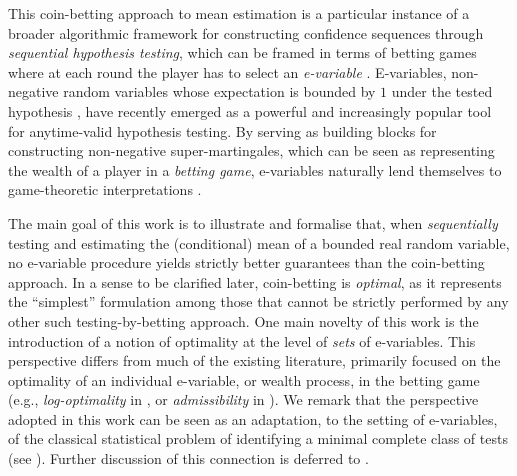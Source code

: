 \documentclass[3p, authoryear, 10pt]{elsarticle}%
\begin{document}
This coin-betting approach to mean estimation is a particular instance of a broader algorithmic framework for constructing confidence sequences through \emph{sequential hypothesis testing}, which can be framed in terms of betting games where at each round the player has to select an \emph{e-variable} \citep{shafer2021testing, ramdas2022admissible, ramdas2023game}. E-variables, non-negative random variables whose expectation is bounded by $1$ under the tested hypothesis \citep{grunwald2024safe}, have recently emerged as a powerful and increasingly popular tool for anytime-valid hypothesis testing. By serving as building blocks for constructing non-negative super-martingales, which  can be seen as representing the wealth of a player in a \emph{betting game}, e-variables naturally lend themselves to game-theoretic interpretations \citep{shafer2019game, ramdas2024hypothesis}. 

The main goal of this work is to illustrate and formalise that, when \emph{sequentially} testing and estimating the (conditional) mean of a bounded real random variable, no e-variable procedure yields strictly better guarantees than the coin-betting approach. In a sense to be clarified later, coin-betting is \emph{optimal}, as it represents the ``simplest'' formulation among those that cannot be strictly performed by any other such testing-by-betting approach. One main novelty of this work is the introduction of a notion of optimality at the level of \emph{sets} of e-variables. This perspective differs from much of the existing literature, primarily focused on the optimality of an individual e-variable, or wealth process, in the betting game (e.g., \emph{log-optimality} in \citealt{koolen2022log,grunwald2024safe, larsson2024numeraire}, or \emph{admissibility} in \citealt{ramdas2022admissible}). We remark that the perspective adopted in this work can be seen as an adaptation, to the setting of e-variables, of the classical statistical problem of identifying a minimal complete class of tests (see \citealp{lehmann2005testing}). Further discussion of this connection is deferred to .
\end{document}
